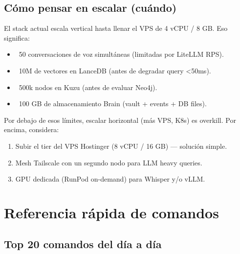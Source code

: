 \documentclass[11pt,a4paper]{article}
\begin{document}
\subsection{Cómo pensar en escalar (cuándo)}

El stack actual escala vertical hasta llenar el VPS de 4 vCPU / 8 GB. Eso significa:

\begin{itemize}[leftmargin=*,itemsep=1pt]
\item ~50 conversaciones de voz simultáneas (limitadas por LiteLLM RPS).
\item ~10M de vectores en LanceDB (antes de degradar query \textless 50ms).
\item ~500k nodos en Kuzu (antes de evaluar Neo4j).
\item ~100 GB de almacenamiento Brain (vault + events + DB files).
\end{itemize}

Por debajo de esos límites, escalar horizontal (más VPS, K8s) es overkill. Por encima, considera:

\begin{enumerate}[leftmargin=*,itemsep=1pt]
\item Subir el tier del VPS Hostinger (8 vCPU / 16 GB) — solución simple.
\item Mesh Tailscale con un segundo nodo para LLM heavy queries.
\item GPU dedicada (RunPod on-demand) para Whisper y/o vLLM.
\end{enumerate}

\newpage

\section{Referencia rápida de comandos}

\subsection{Top 20 comandos del día a día}
\end{document}
